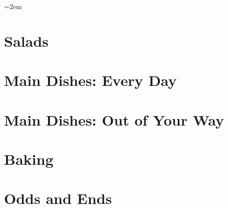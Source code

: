 \documentclass[landscape,12pt,openany]{book}
\begin{document}
\rmfamily

\setlength{\columnseprule}{0pt}
\columnsep=2em

\setcounter{tocdepth}{1}
\small
\tableofcontents

\normalsize

\setlength{\parskip}{.5em}

\chapter{Salads}











\chapter{Main Dishes: Every Day}




























\chapter{Main Dishes: Out of Your Way}






\chapter{Baking}







\chapter{Odds and Ends}









\end{document}
